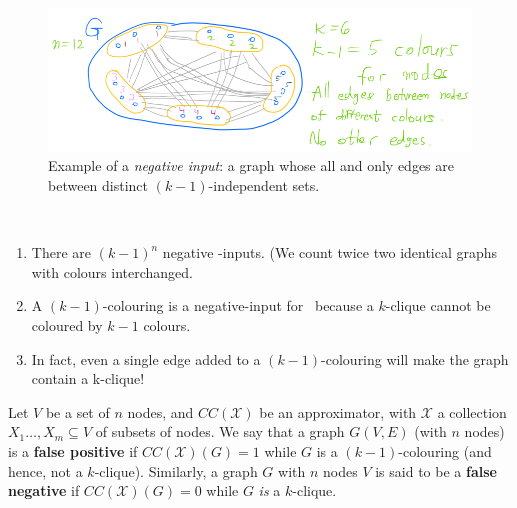 \begin{description}
\begin{figure}[H]
    \centering
    \includegraphics[width=.6\linewidth]{images/clique2.png}
    \caption{Example of a \emph{negative input}: a graph whose all and only edges are between distinct $(k-1)$-independent sets.}
    \label{fig:enter-label}
\end{figure}

\end{description}

\begin{note}\

\begin{enumerate}
\item There are $(k-1)^n$ negative -inputs. (We count twice two identical graphs with colours interchanged.

\item 
 A $(k-1)$-colouring is a negative-input for \cliquenk\ because a $k$-clique cannot be coloured by $k-1$ colours.
\item
 In fact, even a single edge added to a $(k-1)$-colouring will make the graph contain a k-clique!
\end{enumerate}
\end{note}


Let $V$ be a set of $n$ nodes, and  $CC(\mathcal X)$ be an   approximator, with  $\mathcal X$ a collection $X_1\dots,X_m\subseteq V$ of subsets of nodes. We say that  a graph $G(V,E)$ (with $n$ nodes) is a \textbf{false positive} if $CC(\mathcal X)(G)=1$ while $G$ is  a $(k-1)$-colouring (and hence, not a $k$-clique). Similarly, a graph $G$ with $n$ nodes $V$ is said to be a \textbf{false negative} if $CC(\mathcal X)(G)=0$ while $G$ \emph{is} a $k$-clique.







